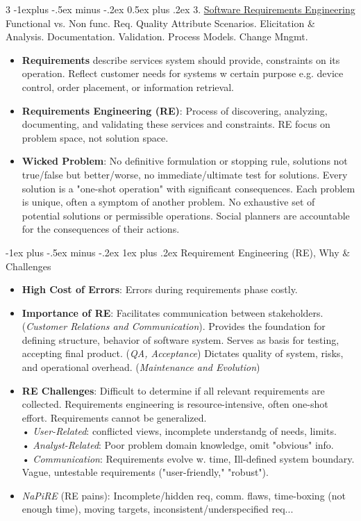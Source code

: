 \documentclass[a4paper, 10pt, landscape]{article}
\makeatletter
\renewcommand{\subsection}{\@startsection{subsection}{2}{0mm}%
                                {-1explus -.5ex minus -.2ex}%
                                {0.5ex plus .2ex}%
                                {\normalfont\normalsize\bfseries}}
\renewcommand{\subsubsection}{\@startsection{subsubsection}{3}{0mm}%
                                {-1ex plus -.5ex minus -.2ex}%
                                {1ex plus .2ex}%
                                {\normalfont\small\bfseries}}
\makeatother
\begin{document}
\begin{multicols*}{3}
\subsection{3. \underline{Software Requirements Engineering}}
Functional vs. Non func. Req. Quality Attribute Scenarios. Elicitation \& Analysis. Documentation. Validation. Process Models. Change Mngmt.
\begin{itemize}
	\item \textbf{Requirements} describe services system should provide, constraints on its operation. Reflect customer needs for systems w certain purpose e.g. device control, order placement, or information retrieval.
    \item \textbf{Requirements Engineering (RE)}: Process of discovering, analyzing, documenting, and validating these services and constraints. RE focus on problem space, not solution space.
    \item \textbf{Wicked Problem}: No definitive formulation or stopping rule, solutions not true/false but better/worse, no immediate/ultimate test for solutions. Every solution is a "one-shot operation" with significant consequences. Each problem is unique, often a symptom of another problem. No exhaustive set of potential solutions or permissible operations. Social planners are accountable for the consequences of their actions.
\end{itemize}	

\subsubsection{Requirement Engineering (RE), Why \& Challenges}
\begin{itemize}
	\item \textbf{High Cost of Errors}: Errors during requirements phase costly.
    \item \textbf{Importance of RE}: Facilitates communication between stakeholders. (\textit{Customer Relations and Communication}). Provides the foundation for defining structure, behavior of software system. Serves as basis for testing, accepting final product. (\textit{QA, Acceptance}) Dictates quality of system, risks, and operational overhead. (\textit{Maintenance and Evolution})
    \item \textbf{RE Challenges}: Difficult to determine if all relevant requirements are collected. Requirements engineering is resource-intensive, often one-shot effort. Requirements cannot be generalized.\\
    • \textit{User-Related}: conflicted views, incomplete understandg of needs, limits.\\
    • \textit{Analyst-Related}: Poor problem domain knowledge, omit "obvious" info. \\
    • \textit{Communication}: Requirements evolve w. time, Ill-defined system boundary. Vague, untestable requirements ("user-friendly," "robust").
    \item \textit{NaPiRE} (RE pains): Incomplete/hidden req, comm. flaws, time-boxing (not enough time), moving targets, inconsistent/underspecified req...
\end{itemize}


\end{multicols*}
\end{document}

